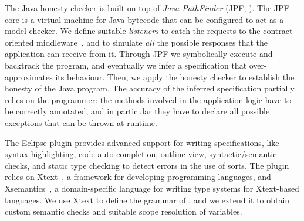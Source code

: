 The Java honesty checker is built on top of \emph{Java PathFinder}
(JPF, \cite{lerda2001addressing,visser2003model}).
The JPF core is a virtual machine for Java bytecode
that can be configured to act as a model checker.
%
We define suitable \emph{listeners} to catch the 
requests to the contract-oriented middleware~\cite{CO2middleware},
and to simulate \emph{all} the possible responses that 
the application can receive from it.
%
%
Through JPF we symbolically execute and backtrack the program, %
and eventually we infer a \coco specification that over-approximates its behaviour.
Then, we apply the \coco honesty checker to establish the honesty of the Java program.
%
The accuracy of the inferred \coco specification partially relies on the programmer:
the methods involved in the application logic have to be correctly annotated,
and in particular they have to declare all possible exceptions that can be thrown at runtime.

The Eclipse plugin provides advanced support for writing \coco specifications,
like
syntax highlighting, 
code auto-completion, 
outline view,
syntactic/semantic checks,
and static type checking to detect errors in the use of sorts.
%
The plugin relies on
Xtext~\cite{xtext-site}, a framework for developing programming languages, 
and Xsemantics~\cite{xsemantics-site}, a domain-specific language for writing type systems
for Xtext-based languages.
%
We use Xtext to define the grammar of \coco,
and we extend it to obtain custom semantic checks 
and suitable scope resolution of variables.

